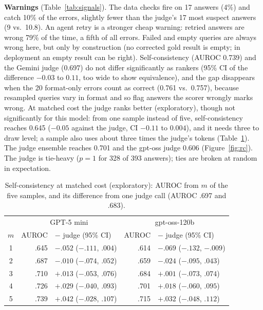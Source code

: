 \documentclass[conference]{IEEEtran}
\begin{document}
\textbf{Warnings} (Table~\ref{tab:signals}). The data checks fire on 17 answers (4\%) and catch 10\%
of the errors, slightly fewer than the judge's 17 most suspect answers (9 vs.\ 10.8). An agent retry
is a stronger cheap warning: retried answers are wrong 79\% of the time, a fifth of all errors. Failed
and empty queries are always wrong here, but only by construction (no corrected gold result is empty;
in deployment an empty result can be right). Self-consistency (AUROC 0.739) and the Gemini judge
(0.697) do not differ significantly as rankers (95\% CI of the difference $-0.03$ to $0.11$, too wide to show
equivalence), and the gap disappears when the 20 format-only errors count as correct (0.761 vs.\ 0.757), because resampled
queries vary in format and so flag answers the scorer wrongly marks wrong. At matched cost the judge
ranks better (exploratory), though not significantly for this model: from one sample instead of five,
self-consistency reaches 0.645 ($-0.05$ against the judge, CI $-0.11$ to $0.004$), and it needs three
to draw level; a sample also uses about three times
the judge's tokens (Table~\ref{tab:cost}). The judge ensemble reaches
0.701 and the gpt-oss judge 0.606 (Figure~\ref{fig:rc}). The judge is tie-heavy ($p=1$ for 328 of 393
answers); ties are broken at random in expectation.

\begin{table}[t]
\centering\footnotesize
\setlength{\tabcolsep}{2pt}
\begin{tabular}{crlrl}
\toprule
 & \multicolumn{2}{c}{GPT-5 mini} & \multicolumn{2}{c}{gpt-oss-120b} \\
$m$ & AUROC & $-$ judge (95\% CI) & AUROC & $-$ judge (95\% CI) \\
\midrule
1 & .645 & $-.052$ ($-.111$, $.004$) & .614 & $-.069$ ($-.132$, $-.009$) \\
2 & .687 & $-.010$ ($-.074$, $.052$) & .659 & $-.024$ ($-.095$, $.043$) \\
3 & .710 & $+.013$ ($-.053$, $.076$) & .684 & $+.001$ ($-.073$, $.074$) \\
4 & .726 & $+.029$ ($-.040$, $.093$) & .701 & $+.018$ ($-.060$, $.095$) \\
5 & .739 & $+.042$ ($-.028$, $.107$) & .715 & $+.032$ ($-.048$, $.112$) \\
\bottomrule
\end{tabular}
\caption{Self-consistency at matched cost (exploratory): AUROC from $m$ of the five samples, and its
difference from one judge call (AUROC .697 and .683).}
\label{tab:cost}
\end{table}
\end{document}
